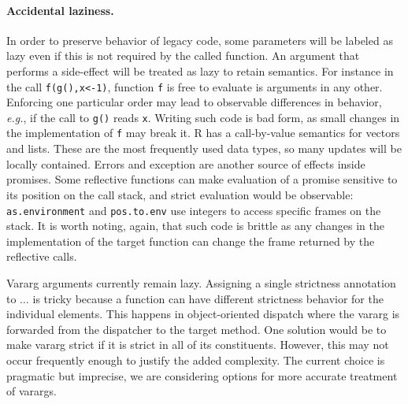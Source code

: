 \documentclass[review,nonacm,screen,acmsmall,anonymous=true]{acmart}
\newcommand{\code}[1]{\lstinline |#1|\xspace}
\renewcommand{\c}[1]{\lstinline |#1|\xspace}
\newcommand{\eg}{\emph{e.g.},\xspace}
\begin{document}
\paragraph{Accidental laziness.} In order to preserve behavior of legacy code,
some parameters will be labeled as lazy even if this is not required by the
called function. An argument that performs a side-effect will be treated as lazy
to retain semantics. For instance in the call \c{f(g(),x<-1)},
function \c f is free to evaluate is arguments in any other. Enforcing one
particular order may lead to observable differences in behavior, \eg if the call to
\c{g()} reads \c{x}. Writing such code is bad form, as small changes in the
implementation of \c f may break it. R has a call-by-value semantics for vectors
and lists. These are the most frequently used data types, so many updates will
be locally contained. Errors and exception are another source of effects inside
promises. Some reflective functions can make evaluation of a promise sensitive to
its position on the call stack, and strict evaluation would be observable:
\code{as.environment} and \code{pos.to.env} use integers to access specific
frames on the stack. It is worth noting, again, that such code is brittle as any
changes in the implementation of the target function can change the frame
returned by the reflective calls.

Vararg arguments currently remain lazy. Assigning a single strictness annotation
to $\dots$ is tricky because a function can have different strictness behavior
for the individual elements. This happens in object-oriented dispatch where the
vararg is forwarded from the dispatcher to the target method. One solution would
be to make vararg strict if it is strict in all of its constituents. However,
this may not occur frequently enough to justify the added complexity. The
current choice is pragmatic but imprecise, we are considering options for more
accurate treatment of varargs.
\end{document}
